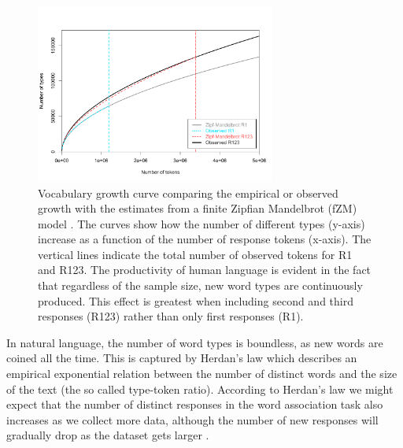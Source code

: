 \documentclass[a4paper,doc,natbib,floatsintext]{apa6}
\begin{document}
\begin{figure}[t]
\centering
\includegraphics[width=0.7\textwidth]{figures/VocabularyGrowth.pdf}
\caption{\small{Vocabulary growth curve comparing the empirical or observed growth with the estimates from a finite Zipfian Mandelbrot (fZM) model \citep{evertbaroni}. The curves show how the number of different types (y-axis) increase as a function of the number of response tokens (x-axis).
The vertical lines indicate the total number of observed tokens for R1 and R123.
The productivity of human language is evident in the fact that regardless of the sample size, new word types are continuously produced. This effect is greatest when including second and third responses (R123) rather than only first responses (R1).}}
\label{figure:VocabularyGrowth}
\end{figure}


In natural language, the number of word types is boundless, as new words are coined all the time. This is captured by Herdan's law which describes an empirical exponential relation between the number of distinct words and the size of the text (the so called type-token ratio). According to Herdan's law we might expect that the number of distinct responses in the word association task also increases as we collect more data, although the number of new responses will gradually drop as the dataset gets larger \citep{Herdan1964}.
\end{document}
